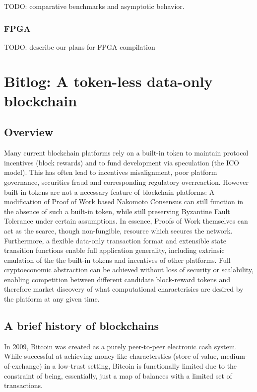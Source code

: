 \documentclass{article}
\theoremstyle{definition}
\theoremstyle{theorem}
\begin{document}
TODO: comparative benchmarks and asymptotic behavior.

\subsubsection{FPGA}

TODO: describe our plans for FPGA compilation

\section{Bitlog: A token-less data-only blockchain}

\subsection{Overview}
Many current blockchain platforms rely on a built-in token to maintain
protocol incentives (block rewards) and to fund development via speculation (the
ICO model). This has often lead to incentives misalignment, poor platform
governance, securities fraud and corresponding regulatory overreaction.
However built-in tokens are not a necessary feature of blockchain platforms: A
modification of Proof of Work based Nakomoto Consensus can still function in the
absence of such a built-in token, while still preserving Byzantine Fault
Tolerance under certain assumptions. In essence, Proofs of Work themselves can
act as the scarce, though non-fungible, resource which secures the network.
Furthermore, a flexible data-only transaction format and extensible state
transition functions enable full application generality, including extrinsic
emulation of the the built-in tokens and incentives of other platforms. Full
cryptoeconomic abstraction can be achieved without loss of security or
scalability, enabling competition between different candidate block-reward
tokens and therefore market discovery of what computational characterisics are
desired by the platform at any given time.

\subsection{A brief history of blockchains}

In 2009, Bitcoin was created as a purely peer-to-peer electronic cash system.
While successful at achieving money-like characterstics (store-of-value,
medium-of-exchange) in a low-trust setting, Bitcoin is functionally limited due
to the constraint of being, essentially, just a map of balances with a limited
set of transactions.
\end{document}
